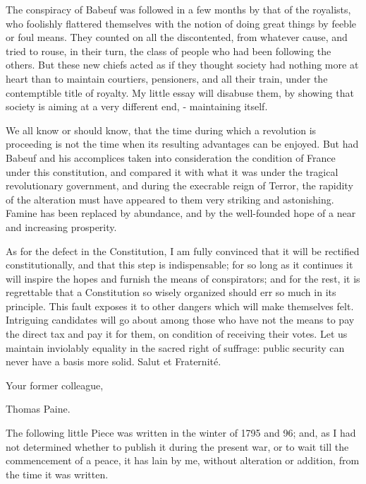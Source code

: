 The conspiracy of Babeuf was followed in a few months by that of the royalists, who foolishly flattered themselves with the notion of doing great things by feeble or foul means. They counted on all the discontented, from whatever cause, and tried to rouse, in their turn, the class of people who had been following the others. But these new chiefs acted as if they thought society had nothing more at heart than to maintain courtiers, pensioners, and all their train, under the contemptible title of royalty. My little essay will disabuse them, by showing that society is aiming at a very different end, - maintaining itself.\par

We all know or should know, that the time during which a revolution is proceeding is not the time when its resulting advantages can be enjoyed. But had Babeuf and his accomplices taken into consideration the condition of France under this constitution, and compared it with what it was under the tragical revolutionary government, and during the execrable reign of Terror, the rapidity of the alteration must have appeared to them very striking and astonishing. Famine has been replaced by abundance, and by the well-founded hope of a near and increasing prosperity.\par

As for the defect in the Constitution, I am fully convinced that it will be rectified constitutionally, and that this step is indispensable; for so long as it continues it will inspire the hopes and furnish the means of conspirators; and for the rest, it is regrettable that a Constitution so wisely organized should err so much in its principle. This fault exposes it to other dangers which will make themselves felt. Intriguing candidates will go about among those who have not the means to pay the direct tax and pay it for them, on condition of receiving their votes. Let us maintain inviolably equality in the sacred right of suffrage: public security can never have a basis more solid. Salut et Fraternité.\par

Your former colleague,\par

Thomas Paine.\par


The following little Piece was written in the winter of 1795 and 96; and, as I had not determined whether to publish it during the present war, or to wait till the commencement of a peace, it has lain by me, without alteration or addition, from the time it was written.\par

